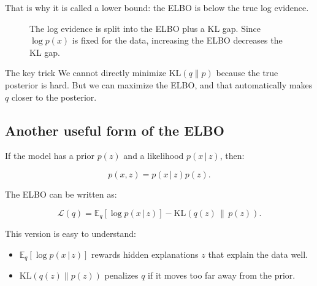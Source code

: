 \documentclass[11pt]{article}
\newcommand{\E}{\mathbb{E}}
\newcommand{\KL}{\mathrm{KL}}
\newcommand{\given}{\,|\,}
\begin{document}
That is why it is called a lower bound: the ELBO is below the true log evidence.

\begin{figure}[h]
\centering
{}
\caption{The log evidence is split into the ELBO plus a KL gap. Since $\log p(x)$ is fixed for the data, increasing the ELBO decreases the KL gap.}
\end{figure}

\begin{idea}{The key trick}
We cannot directly minimize $\KL(q\|p)$ because the true posterior is hard.
But we can maximize the ELBO, and that automatically makes $q$ closer to the posterior.
\end{idea}

\subsection{Another useful form of the ELBO}

If the model has a prior $p(z)$ and a likelihood $p(x\given z)$, then:

\[
p(x,z) = p(x\given z)p(z).
\]

The ELBO can be written as:

\begin{equation}
\boxed{
\mathcal{L}(q)
= \E_q[\log p(x\given z)] - \KL(q(z)\,\|\,p(z)).
}
\end{equation}

This version is easy to understand:

\begin{itemize}[leftmargin=*]
  \item $\E_q[\log p(x\given z)]$ rewards hidden explanations $z$ that explain the data well.
  \item $\KL(q(z)\|p(z))$ penalizes $q$ if it moves too far away from the prior.
\end{itemize}
\end{document}
